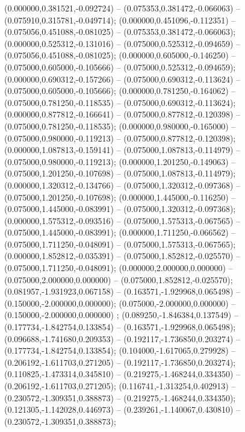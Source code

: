 (0.000000,0.381521,-0.092724) -- (0.075353,0.381472,-0.066063) -- (0.075910,0.315781,-0.049714);
 (0.000000,0.451096,-0.112351) -- (0.075056,0.451088,-0.081025) -- (0.075353,0.381472,-0.066063);
 (0.000000,0.525312,-0.131016) -- (0.075000,0.525312,-0.094659) -- (0.075056,0.451088,-0.081025);
 (0.000000,0.605000,-0.146250) -- (0.075000,0.605000,-0.105666) -- (0.075000,0.525312,-0.094659);
 (0.000000,0.690312,-0.157266) -- (0.075000,0.690312,-0.113624) -- (0.075000,0.605000,-0.105666);
 (0.000000,0.781250,-0.164062) -- (0.075000,0.781250,-0.118535) -- (0.075000,0.690312,-0.113624);
 (0.000000,0.877812,-0.166641) -- (0.075000,0.877812,-0.120398) -- (0.075000,0.781250,-0.118535);
 (0.000000,0.980000,-0.165000) -- (0.075000,0.980000,-0.119213) -- (0.075000,0.877812,-0.120398);
 (0.000000,1.087813,-0.159141) -- (0.075000,1.087813,-0.114979) -- (0.075000,0.980000,-0.119213);
 (0.000000,1.201250,-0.149063) -- (0.075000,1.201250,-0.107698) -- (0.075000,1.087813,-0.114979);
 (0.000000,1.320312,-0.134766) -- (0.075000,1.320312,-0.097368) -- (0.075000,1.201250,-0.107698);
 (0.000000,1.445000,-0.116250) -- (0.075000,1.445000,-0.083991) -- (0.075000,1.320312,-0.097368);
 (0.000000,1.575312,-0.093516) -- (0.075000,1.575313,-0.067565) -- (0.075000,1.445000,-0.083991);
 (0.000000,1.711250,-0.066562) -- (0.075000,1.711250,-0.048091) -- (0.075000,1.575313,-0.067565);
 (0.000000,1.852812,-0.035391) -- (0.075000,1.852812,-0.025570) -- (0.075000,1.711250,-0.048091);
 (0.000000,2.000000,0.000000) -- (0.075000,2.000000,0.000000) -- (0.075000,1.852812,-0.025570);
 (0.081957,-1.931923,0.067158) -- (0.163571,-1.929968,0.065498) -- (0.150000,-2.000000,0.000000);
 (0.075000,-2.000000,0.000000) -- (0.150000,-2.000000,0.000000) ;
 (0.089250,-1.846384,0.137549) -- (0.177734,-1.842754,0.133854) -- (0.163571,-1.929968,0.065498);
 (0.096688,-1.741680,0.209353) -- (0.192117,-1.736850,0.203274) -- (0.177734,-1.842754,0.133854);
 (0.104000,-1.617065,0.279928) -- (0.206192,-1.611703,0.271205) -- (0.192117,-1.736850,0.203274);
 (0.110825,-1.473314,0.345810) -- (0.219275,-1.468244,0.334350) -- (0.206192,-1.611703,0.271205);
 (0.116741,-1.313254,0.402913) -- (0.230572,-1.309351,0.388873) -- (0.219275,-1.468244,0.334350);
 (0.121305,-1.142028,0.446973) -- (0.239261,-1.140067,0.430810) -- (0.230572,-1.309351,0.388873);
